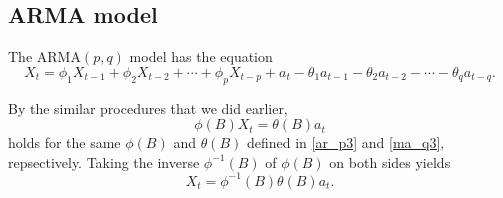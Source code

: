 \documentclass{article}
\newcommand\arma{\ensuremath{\text{ARMA}}}
\begin{document}
%
\subsection{ARMA model}
The \(\arma(p,q)\) model has the equation
\begin{equation}\label{arma_pq1}
X_t=\phi_1X_{t-1}+\phi_2X_{t-2}+\cdots+\phi_pX_{t-p}+a_t-\theta_1a_{t-1}-\theta_2a_{t-2}-\cdots-\theta_qa_{t-q}.
\end{equation}

By the similar procedures that we did earlier,
\begin{equation}\label{arma_pq2}
\phi(B)X_t=\theta(B)a_t
\end{equation}
holds for the same \(\phi(B)\) and \(\theta(B)\) defined in \eqref{ar_p3} and \eqref{ma_q3}, repsectively.
Taking the inverse \(\phi^{-1}(B)\) of \(\phi(B)\) on both sides yields
\begin{equation}\label{arma_pq2}
X_t=\phi^{-1}(B)\theta(B)a_t.
\end{equation}

\end{document}
